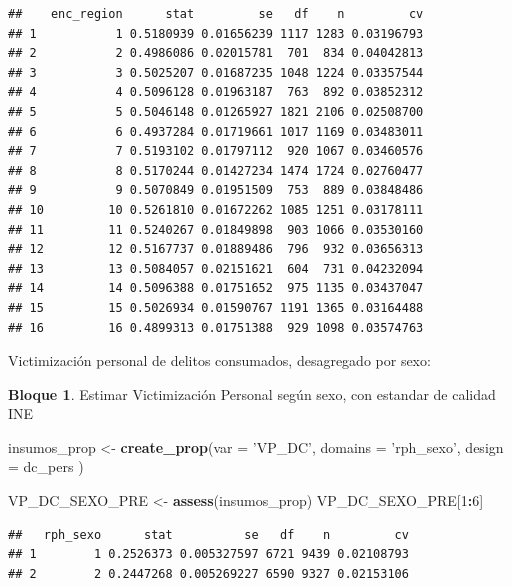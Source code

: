 \documentclass[]{book}
\newenvironment{Shaded}{\begin{snugshade}}{\end{snugshade}}
\newcommand{\DataTypeTok}[1]{\textcolor[rgb]{0.13,0.29,0.53}{#1}}
\newcommand{\DecValTok}[1]{\textcolor[rgb]{0.00,0.00,0.81}{#1}}
\newcommand{\KeywordTok}[1]{\textcolor[rgb]{0.13,0.29,0.53}{\textbf{#1}}}
\newcommand{\NormalTok}[1]{#1}
\newcommand{\OperatorTok}[1]{\textcolor[rgb]{0.81,0.36,0.00}{\textbf{#1}}}
\newcommand{\StringTok}[1]{\textcolor[rgb]{0.31,0.60,0.02}{#1}}
\theoremstyle{definition}
\theoremstyle{definition}
\newtheorem{example}{Bloque}[chapter]
\theoremstyle{definition}
\theoremstyle{definition}
\theoremstyle{remark}
\begin{document}
\begin{verbatim}
##    enc_region      stat         se   df    n         cv
## 1           1 0.5180939 0.01656239 1117 1283 0.03196793
## 2           2 0.4986086 0.02015781  701  834 0.04042813
## 3           3 0.5025207 0.01687235 1048 1224 0.03357544
## 4           4 0.5096128 0.01963187  763  892 0.03852312
## 5           5 0.5046148 0.01265927 1821 2106 0.02508700
## 6           6 0.4937284 0.01719661 1017 1169 0.03483011
## 7           7 0.5193102 0.01797112  920 1067 0.03460576
## 8           8 0.5170244 0.01427234 1474 1724 0.02760477
## 9           9 0.5070849 0.01951509  753  889 0.03848486
## 10         10 0.5261810 0.01672262 1085 1251 0.03178111
## 11         11 0.5240267 0.01849898  903 1066 0.03530160
## 12         12 0.5167737 0.01889486  796  932 0.03656313
## 13         13 0.5084057 0.02151621  604  731 0.04232094
## 14         14 0.5096388 0.01751652  975 1135 0.03437047
## 15         15 0.5026934 0.01590767 1191 1365 0.03164488
## 16         16 0.4899313 0.01751388  929 1098 0.03574763
\end{verbatim}

Victimización personal de delitos consumados, desagregado por sexo:

\begin{example}
\protect\hypertarget{exm:bloque11nbm}{}{\label{exm:bloque11nbm} }Estimar Victimización Personal según sexo, con estandar de calidad INE
\end{example}

\begin{Shaded}
\begin{Highlighting}[]
\NormalTok{insumos_prop <-}\StringTok{ }\KeywordTok{create_prop}\NormalTok{(}\DataTypeTok{var =} \StringTok{'VP_DC'}\NormalTok{, }
                                   \DataTypeTok{domains =} \StringTok{'rph_sexo'}\NormalTok{, }
                                   \DataTypeTok{design =}\NormalTok{  dc_pers}
\NormalTok{                                )}

\NormalTok{VP_DC_SEXO_PRE <-}\StringTok{ }\KeywordTok{assess}\NormalTok{(insumos_prop)}
\NormalTok{VP_DC_SEXO_PRE[}\DecValTok{1}\OperatorTok{:}\DecValTok{6}\NormalTok{]}
\end{Highlighting}
\end{Shaded}

\begin{verbatim}
##   rph_sexo      stat          se   df    n         cv
## 1        1 0.2526373 0.005327597 6721 9439 0.02108793
## 2        2 0.2447268 0.005269227 6590 9327 0.02153106
\end{verbatim}
\end{document}
